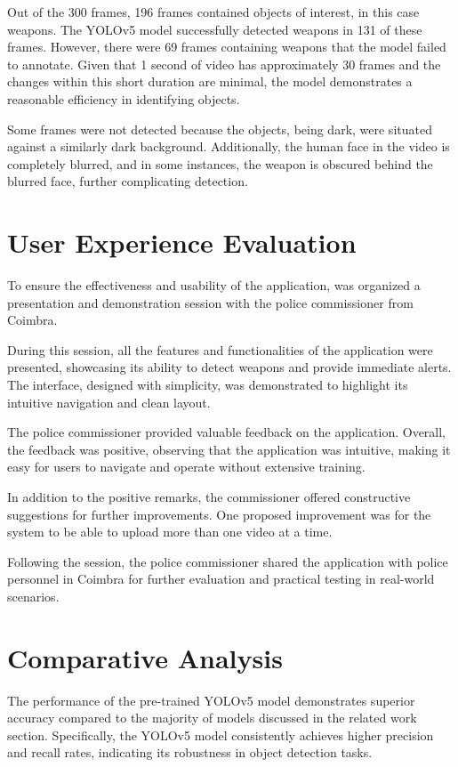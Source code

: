 Out of the 300 frames, 196 frames contained objects of interest, in this case weapons. The YOLOv5 model successfully 
detected 
weapons in 131 of these frames. However, there were 69 frames containing weapons that the model failed to annotate.
Given that 1 second of video has approximately 30 frames and the changes within this short duration are minimal, the 
model demonstrates a reasonable efficiency in identifying objects.

Some frames were not detected because the objects, being dark, were situated against a similarly dark background. 
Additionally, the human face in the video is completely blurred, and in some instances, the weapon 
is obscured behind the blurred face, further complicating detection.

\section{User Experience Evaluation}
To ensure the effectiveness and usability of the application, was organized a presentation and demonstration session 
with the police commissioner from Coimbra.

During this session, all the features and functionalities of the application were presented, showcasing its ability to 
detect weapons and provide immediate alerts. The interface, designed with simplicity, was demonstrated to highlight 
its intuitive navigation and clean layout.

The police commissioner provided valuable feedback on the application. Overall, the feedback was positive, observing that 
the application was intuitive, making it easy for users to navigate and operate without extensive training.

In addition to the positive remarks, the commissioner offered constructive suggestions for further improvements.
One proposed improvement was for the system to be able to upload more than one video at a time.

Following the session, the police commissioner shared the application with police personnel in Coimbra for 
further evaluation and practical testing in real-world scenarios.
\section{Comparative Analysis}
The performance of the pre-trained YOLOv5 model demonstrates superior accuracy compared to the majority of models 
discussed in the related work section. Specifically, the YOLOv5 model consistently achieves higher precision and 
recall rates, indicating its robustness in object detection tasks.

